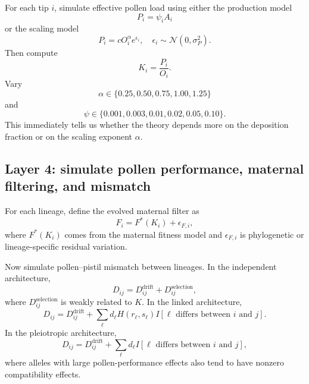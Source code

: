 \documentclass[11pt]{article}
\newcommand{\Normal}{\mathcal{N}}
\begin{document}
For each tip \(i\), simulate effective pollen load using either the production model
\begin{equation}
P_i=\psi_iA_i
\end{equation}
or the scaling model
\begin{equation}
P_i=cO_i^\alpha e^{\epsilon_i},
\quad
\epsilon_i\sim \Normal(0,\sigma_P^2).
\end{equation}
Then compute
\begin{equation}
K_i=\frac{P_i}{O_i}.
\end{equation}
Vary
\begin{equation}
\alpha\in\{0.25,0.50,0.75,1.00,1.25\}
\end{equation}
and
\begin{equation}
\psi\in\{0.001,0.003,0.01,0.02,0.05,0.10\}.
\end{equation}
This immediately tells us whether the theory depends more on the deposition fraction or on the scaling exponent \(\alpha\).

\subsection{Layer 4: simulate pollen performance, maternal filtering, and mismatch}

For each lineage, define the evolved maternal filter as
\begin{equation}
F_i=F^*(K_i)+\epsilon_{F,i},
\end{equation}
where \(F^*(K_i)\) comes from the maternal fitness model and \(\epsilon_{F,i}\) is phylogenetic or lineage-specific residual variation.

Now simulate pollen--pistil mismatch between lineages. In the independent architecture,
\begin{equation}
D_{ij}=D_{ij}^{\mathrm{drift}}+D_{ij}^{\mathrm{selection}},
\end{equation}
where \(D_{ij}^{\mathrm{selection}}\) is weakly related to \(K\). In the linked architecture,
\begin{equation}
D_{ij}=D_{ij}^{\mathrm{drift}}+\sum_\ell d_\ell H(r_\ell,s_\ell)I[\ell\text{ differs between }i\text{ and }j].
\end{equation}
In the pleiotropic architecture,
\begin{equation}
D_{ij}=D_{ij}^{\mathrm{drift}}+\sum_\ell d_\ell I[\ell\text{ differs between }i\text{ and }j],
\end{equation}
where alleles with large pollen-performance effects also tend to have nonzero compatibility effects.
\end{document}
